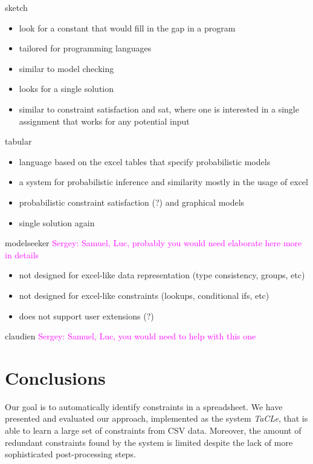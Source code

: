 \documentclass{sig-alternate-05-2015}
\newcommand{\sergey}[1]{\textcolor{magenta}{{\sc Sergey:} #1}\xspace}
\newcommand{\format}[1]{\textit{#1}\xspace}
\newcommand{\sname}{\format{TaCLe}}
\begin{document}
sketch \cite{sketch}
\begin{itemize}
  \item look for a constant that would fill in the gap in a program
  \item tailored for programming languages
  \item similar to model checking
  \item looks for a single solution
  \item similar to constraint satisfaction and sat, where one is interested in a single assignment that works for any potential input
\end{itemize}

tabular \cite{tabular}
\begin{itemize}
  \item language based on the excel tables that specify probabilistic models
  \item a system for probabilistic inference and similarity mostly in the usage of excel
  \item probabilistic constraint satisfaction (?) and graphical models
  \item single solution again
\end{itemize}

modelseeker \cite{modelseeker} \sergey{Samuel, Luc, probably you would need elaborate here more in details}

\begin{itemize}
  \item not designed for excel-like data representation (type consistency, groups, etc)
  \item not designed for excel-like constraints (lookups, conditional ifs, etc)
  \item does not support user extensions (?)
\end{itemize}

claudien \cite{claudien} \sergey{Samuel, Luc, you would need to help with this one}

\section{Conclusions}\label{sec:conclusions}

Our goal is to automatically identify constraints in a spreadsheet.
We have presented and evaluated our approach, implemented as the system \sname, that is able to learn a large set of constraints from CSV data.
Moreover, the amount of redundant constraints found by the system is limited despite the lack of more sophisticated post-processing steps.
\end{document}
